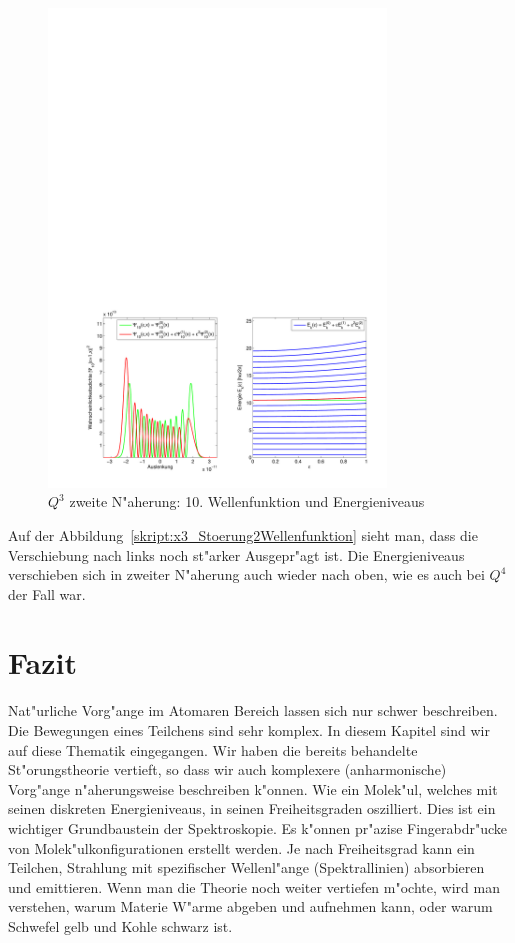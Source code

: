 \begin{refsection}
\begin{figure}	%
\centering
\includegraphics[width=0.8\textwidth]{anharmonisch/images/x3/Stoerung2Wellenfunktion.pdf}
\caption{$Q^3$ zweite N"aherung: 10. Wellenfunktion und Energieniveaus
\label{skript:x3_Stoerung1Wellenfunktion}}
\end{figure}

Auf der Abbildung~\ref{skript:x3_Stoerung2Wellenfunktion} sieht man,
dass die Verschiebung nach links noch st"arker Ausgepr"agt ist.
Die Energieniveaus verschieben sich in zweiter N"aherung auch wieder nach oben,
wie es auch bei $Q^4$ der Fall war.

\section{Fazit}

Nat"urliche Vorg"ange im Atomaren Bereich lassen sich nur schwer  beschreiben.
Die Bewegungen eines Teilchens sind sehr komplex.
In diesem Kapitel sind wir auf diese Thematik eingegangen.
Wir haben die bereits behandelte St"orungstheorie vertieft,
so dass wir auch komplexere (anharmonische) Vorg"ange n"aherungsweise
beschreiben k"onnen.
Wie ein Molek"ul, welches mit seinen diskreten Energieniveaus,
in seinen Freiheitsgraden oszilliert.
Dies ist ein wichtiger Grundbaustein der Spektroskopie.
Es k"onnen pr"azise Fingerabdr"ucke von Molek"ulkonfigurationen erstellt werden.
Je nach Freiheitsgrad kann ein Teilchen, Strahlung mit spezifischer Wellenl"ange
(Spektrallinien)  absorbieren und  emittieren.
Wenn man die Theorie noch weiter vertiefen m"ochte, wird man verstehen,
warum Materie W"arme abgeben und aufnehmen kann,
oder warum Schwefel gelb und Kohle schwarz ist.

\printbibliography[heading=subbibliography]
\end{refsection}

